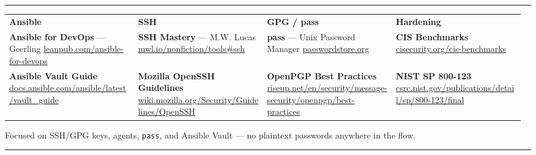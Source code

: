 \documentclass[8pt,letterpaper]{article}
\begin{document}
\vspace{1pt}
\textcolor{headerblue}{\rule{\linewidth}{0.8pt}}
\vspace{2pt}

{\fontsize{6.5}{8.5}\selectfont
\begin{tabular}{@{}p{0.245\linewidth}p{0.245\linewidth}p{0.245\linewidth}p{0.245\linewidth}@{}}
\textbf{\color{headerblue}Ansible} &
\textbf{\color{headerblue}SSH} &
\textbf{\color{headerblue}GPG / pass} &
\textbf{\color{headerblue}Hardening} \\[1pt]
\textbf{Ansible for DevOps} — Geerling\newline
{\fontsize{5.5}{7}\selectfont\href{https://leanpub.com/ansible-for-devops}{leanpub.com/ansible-for-devops}} &
\textbf{SSH Mastery} — M.W. Lucas\newline
{\fontsize{5.5}{7}\selectfont\href{https://mwl.io/nonfiction/tools\#ssh}{mwl.io/nonfiction/tools\#ssh}} &
\textbf{pass} — Unix Password Manager\newline
{\fontsize{5.5}{7}\selectfont\href{https://passwordstore.org}{passwordstore.org}} &
\textbf{CIS Benchmarks}\newline
{\fontsize{5.5}{7}\selectfont\href{https://cisecurity.org/cis-benchmarks}{cisecurity.org/cis-benchmarks}} \\[3pt]
\textbf{Ansible Vault Guide}\newline
{\fontsize{5.5}{7}\selectfont\href{https://docs.ansible.com/ansible/latest/vault_guide}{docs.ansible.com/ansible/latest/vault\_guide}} &
\textbf{Mozilla OpenSSH Guidelines}\newline
{\fontsize{5.5}{7}\selectfont\href{https://wiki.mozilla.org/Security/Guidelines/OpenSSH}{wiki.mozilla.org/Security/Guidelines/OpenSSH}} &
\textbf{OpenPGP Best Practices}\newline
{\fontsize{5.5}{7}\selectfont\href{https://riseup.net/en/security/message-security/openpgp/best-practices}{riseup.net/en/security/message-security/openpgp/best-practices}} &
\textbf{NIST SP 800-123}\newline
{\fontsize{5.5}{7}\selectfont\href{https://csrc.nist.gov/publications/detail/sp/800-123/final}{csrc.nist.gov/publications/detail/sp/800-123/final}} \\
\end{tabular}
}

\vspace{2pt}
{\small\color{gray}Focused on SSH/GPG keys, agents, \texttt{pass}, and Ansible Vault --- no plaintext passwords anywhere in the flow.}\\[1pt]
\textcolor{headerblue}{\rule{\linewidth}{0.8pt}}
\vspace{3pt}
\end{document}
